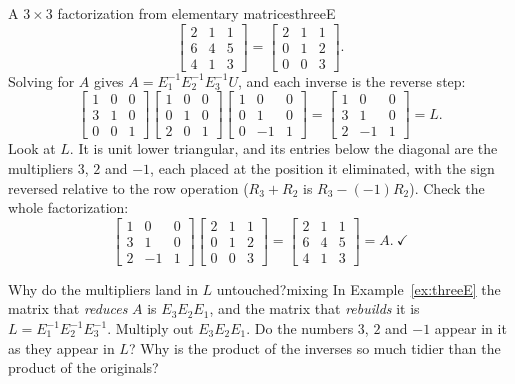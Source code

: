 \documentclass[11pt]{article}
\begin{document}
\begin{exmp}{A $3\times3$ factorization from elementary matrices}{threeE}
\[\begin{bmatrix}2&1&1\\6&4&5\\4&1&3\end{bmatrix}
=\begin{bmatrix}2&1&1\\0&1&2\\0&0&3\end{bmatrix}.
\]
Solving for $A$ gives $A=E_1^{-1}E_2^{-1}E_3^{-1}U$, and each inverse is the reverse step:
\[
\begin{bmatrix}1&0&0\\3&1&0\\0&0&1\end{bmatrix}
\begin{bmatrix}1&0&0\\0&1&0\\2&0&1\end{bmatrix}
\begin{bmatrix}1&0&0\\0&1&0\\0&-1&1\end{bmatrix}
=\begin{bmatrix}1&0&0\\3&1&0\\2&-1&1\end{bmatrix}=L .
\]
Look at $L$. It is unit lower triangular, and its entries below the diagonal are the multipliers $3$, $2$ and $-1$, each placed at the position it eliminated, with the sign reversed relative to the row operation ($R_3+R_2$ is $R_3-(-1)R_2$). Check the whole factorization:
\[
\begin{bmatrix}1&0&0\\3&1&0\\2&-1&1\end{bmatrix}
\begin{bmatrix}2&1&1\\0&1&2\\0&0&3\end{bmatrix}
=\begin{bmatrix}2&1&1\\6&4&5\\4&1&3\end{bmatrix}=A.\ \checkmark
\]
\end{exmp}

\begin{think}{Why do the multipliers land in $L$ untouched?}{mixing}
In Example~\ref{ex:threeE} the matrix that \emph{reduces} $A$ is $E_3E_2E_1$, and the matrix that \emph{rebuilds} it is $L=E_1^{-1}E_2^{-1}E_3^{-1}$. Multiply out $E_3E_2E_1$. Do the numbers $3$, $2$ and $-1$ appear in it as they appear in $L$? Why is the product of the inverses so much tidier than the product of the originals?
\end{think}
\end{document}

